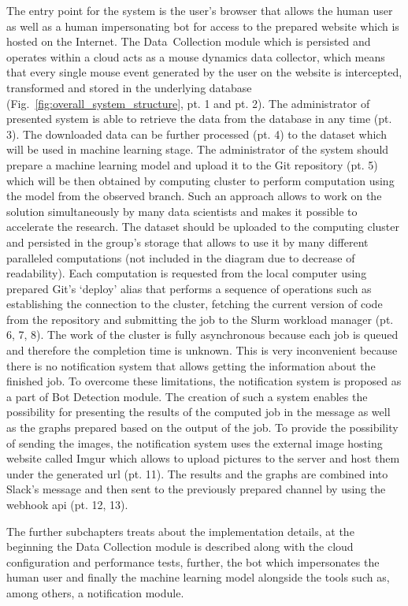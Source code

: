 The entry point for the system is the user's browser that allows the human user as well as a human impersonating bot for access to the prepared website which is hosted on the Internet.
The \mbox{Data Collection} module which is persisted and operates within a cloud acts as a mouse dynamics data collector, which means that every single mouse event generated by the user on the website is intercepted, transformed and stored in the underlying database (Fig.~\ref{fig:overall_system_structure}, pt. 1 and pt. 2).
The administrator of presented system is able to retrieve the data from the database in any time (pt. 3).
The downloaded data can be further processed (pt. 4) to the dataset which will be used in machine learning stage.
The administrator of the system should prepare a machine learning model and upload it to the Git repository (pt. 5) which will be then obtained by computing cluster to perform computation using the model from the observed branch.
Such an approach allows to work on the solution simultaneously by many data scientists and makes it possible to accelerate the research.
The dataset should be uploaded to the computing cluster and persisted in the group's storage that allows to use it by many different paralleled computations (not included in the diagram due to decrease of readability).
Each computation is requested from the local computer using prepared Git's `deploy' alias that performs a sequence of operations such as establishing the connection to the cluster, fetching the current version of code from the repository and submitting the job to the Slurm workload manager (pt. 6, 7, 8).
The work of the cluster is fully asynchronous because each job is queued and therefore the completion time is unknown.
This is very inconvenient because there is no notification system that allows getting the information about the finished job.
To overcome these limitations, the notification system is proposed as a part of Bot Detection module.
The creation of such a system enables the possibility for presenting the results of the computed job in the message as well as the graphs prepared based on the output of the job.
To provide the possibility of sending the images, the notification system uses the external image hosting website called Imgur which allows to upload pictures to the server and host them under the generated \gls{url} (pt. 11).
The results and the graphs are combined into Slack's message and then sent to the previously prepared channel by using the webhook \gls{api} (pt. 12, 13).

The further subchapters treats about the implementation details, at the beginning the Data Collection module is described along with the cloud configuration and performance tests, further, the bot which impersonates the human user and finally the machine learning model alongside the tools such as, among others, a notification module.

